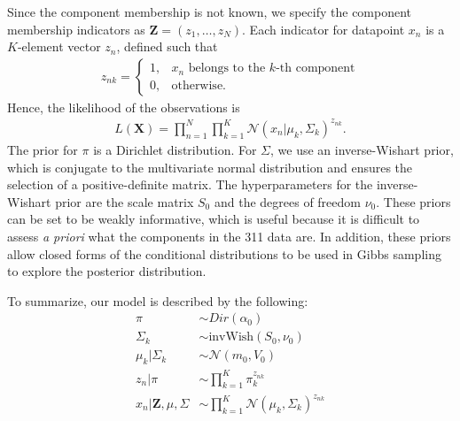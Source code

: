 \documentclass[twoside]{article}
\newcommand{\N}{\mathcal{N}}
\theoremstyle{theorem}
\theoremstyle{theorem}
\theoremstyle{theorem}
\theoremstyle{lemma}
\theoremstyle{definition}
\theoremstyle{example}
\begin{document}
Since the component membership is not known, we specify the component membership indicators as $\mathbf{Z} = (z_1, \ldots, z_N)$. Each indicator for datapoint $x_n$ is a $K$-element vector $z_n$, defined such that \begin{align}
z_{nk} = \begin{cases}
1, & x_n\text{ belongs to the $k$-th component}\\
0, & \text{otherwise}. 
\end{cases}
\end{align}
Hence, the likelihood of the observations is 
\begin{align}
L(\mathbf{X}) = \prod_{n=1}^N\prod_{k=1}^K \N(x_n| \mu_k, \Sigma_k)^{z_{nk}}.
\end{align}
The prior for $\pi$ is a Dirichlet distribution. For $\Sigma$, we use an inverse-Wishart prior, which is conjugate to the multivariate normal distribution and ensures the selection of a positive-definite matrix. The hyperparameters for the inverse-Wishart prior are the scale matrix $S_0$ and the degrees of freedom $\nu_0$.  These priors can be set to be weakly informative, which is useful because it is difficult to assess \textit{a priori} what the components in the 311 data are. In addition, these priors allow closed forms of the conditional distributions to be used in Gibbs sampling to explore the posterior distribution. 

To summarize, our model is described by the following: 
\begin{align}
\pi &\sim Dir(\alpha_0)\\
\Sigma_k &\sim \mathrm{invWish}(S_0, \nu_0)\\
\mu_k | \Sigma_k &\sim \N(m_0, V_0)\\
z_n | \pi &\sim \prod_{k=1}^K \pi_k^{z_{nk}}\\
x_n | \mathbf{Z}, \mu, \Sigma &\sim \prod_{k=1}^K \N(\mu_k, \Sigma_k)^{z_{nk}}
\end{align}
\end{document}
